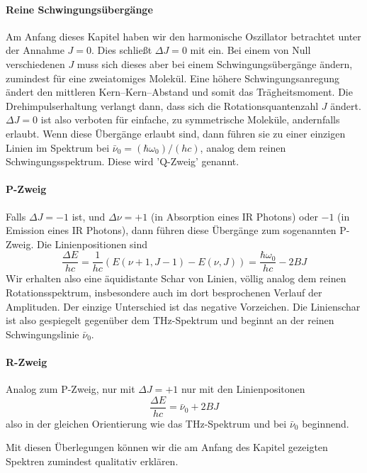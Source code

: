 \paragraph{Reine Schwingungsübergänge} Am Anfang dieses Kapitel haben wir den  harmonische Oszillator betrachtet unter der Annahme $J=0$. Dies schließt $\Delta J = 0$ mit ein. Bei einem von Null verschiedenen $J$ muss sich dieses aber bei einem Schwingungsübergänge ändern, zumindest für eine zweiatomiges Molekül. Eine höhere Schwingungsanregung ändert den mittleren Kern--Kern--Abstand und somit das Trägheitsmoment. Die Drehimpulserhaltung verlangt dann, dass sich die Rotationsquantenzahl $J$ ändert. $\Delta J = 0$ ist also verboten für einfache, zu symmetrische Moleküle, andernfalls erlaubt. Wenn diese Übergänge erlaubt sind, dann führen sie zu einer einzigen Linien im Spektrum bei $ \bar{\nu}_0 = (\hbar \omega_0)/(h c) $, analog dem reinen Schwingungsspektrum. Diese wird 'Q-Zweig' genannt. 

\paragraph{P-Zweig} Falls $\Delta J = -1$ ist, und $\Delta \nu = +1$ (in Absorption eines IR Photons) oder $-1$ (in Emission eines IR Photons), dann führen diese Übergänge zum sogenannten P-Zweig. Die Linienpositionen sind
\begin{equation}
 \frac{\Delta E}{h c} = \frac{1}{h c} ( E(\nu +1, J -1) - E(\nu, J) ) = \frac{\hbar \omega_0}{h c}   - 2 B J
\end{equation}
Wir erhalten also eine äquidistante Schar von Linien, völlig analog dem reinen Rotationsspektrum, insbesondere auch im dort besprochenen Verlauf der Amplituden. Der einzige Unterschied ist das negative Vorzeichen. Die Linienschar ist also gespiegelt gegenüber dem THz-Spektrum und beginnt an der reinen Schwingungslinie $\bar{\nu}_0 $.

\paragraph{R-Zweig} Analog zum P-Zweig, nur mit  $\Delta J = +1$ nur mit den Linienpositonen
\begin{equation}
 \frac{\Delta E}{h c} =  \bar{\nu}_0   + 2 B J
\end{equation}
also in der gleichen Orientierung wie das THz-Spektrum und bei $\bar{\nu}_0 $ beginnend.

Mit diesen Überlegungen können wir die am Anfang des Kapitel gezeigten Spektren zumindest qualitativ erklären.

